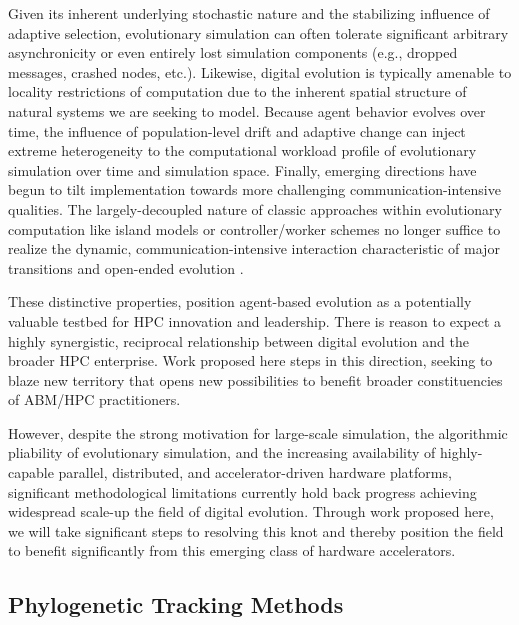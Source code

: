 Given its inherent underlying stochastic nature and the stabilizing influence of adaptive selection, evolutionary simulation can often tolerate significant arbitrary asynchronicity or even entirely lost simulation components (e.g., dropped messages, crashed nodes, etc.).
Likewise, digital evolution is typically amenable to locality restrictions of computation due to the inherent spatial structure of natural systems we are seeking to model.
Because agent behavior evolves over time, the influence of population-level drift and adaptive change can inject extreme heterogeneity to the computational workload profile of evolutionary simulation over time and simulation space.
Finally, emerging directions have begun to tilt implementation towards more challenging communication-intensive qualities.
The largely-decoupled nature of classic approaches within evolutionary computation like island models or controller/worker schemes  \citep{bennett1999building,cantu2001master} no longer suffice to realize the dynamic, communication-intensive interaction characteristic of major transitions and open-ended evolution \citep{moreno2022engineering}.

These distinctive properties, position agent-based evolution as a potentially valuable testbed for HPC innovation and leadership.
There is reason to expect a highly synergistic, reciprocal relationship between digital evolution and the broader HPC enterprise.
Work proposed here steps in this direction, seeking to blaze new territory that opens new possibilities to benefit broader constituencies of ABM/HPC practitioners.

However, despite the strong motivation for large-scale simulation, the algorithmic pliability of evolutionary simulation, and the increasing availability of highly-capable parallel, distributed, and accelerator-driven hardware platforms, significant methodological limitations currently hold back progress achieving widespread scale-up the field of digital evolution.
Through work proposed here, we will take significant steps to resolving this knot and thereby position the field to benefit significantly from this emerging class of hardware accelerators.

\subsection{Phylogenetic Tracking Methods}

